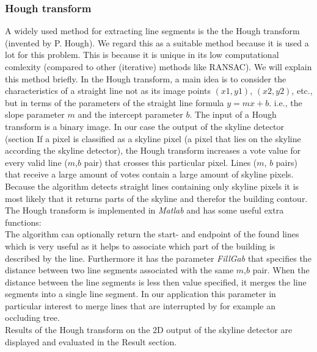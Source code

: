 \documentclass[10pt]{article}
\begin{document}
\subsubsection{Hough transform}
	A widely used method for extracting line segments is the the Hough transform
	(invented by P. Hough).  We regard this as a suitable method because it is
	used a lot for this problem. This is because it is unique in its low
	computational comlexity (compared to other (iterative) methods like RANSAC).
	We will explain this method briefly.
	In the Hough transform, a main idea is to consider the characteristics of a
	straight line not as its image points $(x1, y1)$, $(x2, y2)$, etc., but in
	terms of the parameters of the straight line formula $y = mx + b$. i.e., the
	slope parameter $m$ and the intercept parameter $b$.
	The input of a Hough transform is a binary image. In our case the output of 
	the skyline detector (section %
	If a pixel is classified as a skyline pixel (a pixel that lies on the
	skyline according the skyline detector), the Hough transform increases
	a vote value for every valid line ($m$,$b$ pair) that crosses this
	particular pixel.  Lines ($m$, $b$ pairs) that receive a large amount of votes
	contain a large amount of skyline pixels.  
	Because the algorithm detects straight lines containing only skyline pixels it is
	most likely that it returns parts of the skyline and therefor the building contour. \\
	The Hough transform is implemented in \emph{Matlab} and has some useful extra functions:\\
	The algorithm can optionally return the start- and endpoint of the found lines 
	which is very useful as it helps to associate which part of the building is described by the line.
	Furthermore it has the parameter \emph{FillGab} that specifies the distance
	between two line segments associated with the same $m$,$b$ pair. When the
	distance between the line segments is less then value specified, it merges
	the line segments into a single line segment. In our application this
	parameter in particular interest to merge lines that are interrupted by for
	example an occluding tree.\\

	Results of the Hough transform on the 2D output of the skyline detector are
	displayed and evaluated in the Result section.\\
\end{document}
